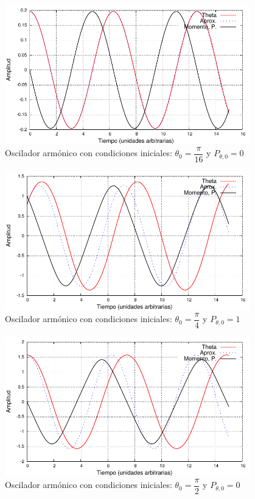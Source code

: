 \documentclass[12pt,letterpaper]{article}
\begin{document}
\begin{figure}
\centering
\includegraphics[width=0.95\textwidth]{Pi16P0.pdf}
\caption{Oscilador armónico con condiciones iniciales: $\theta_0 = \dfrac{\pi}{16}$ y $P_{\theta,0} =  0$}
\end{figure}
\begin{figure}
\centering
\includegraphics[width=0.95\textwidth]{Pi4P1.pdf}
\caption{Oscilador armónico con condiciones iniciales: $\theta_0 = \dfrac{\pi}{4}$ y $P_{\theta,0} =  1$}
\end{figure}
\begin{figure}
\centering
\includegraphics[width=0.95\textwidth]{Pi2P0.pdf}
\caption{Oscilador armónico con condiciones iniciales: $\theta_0 = \dfrac{\pi}{2}$ y $P_{\theta,0} =  0$}
\end{figure}
\end{document}
